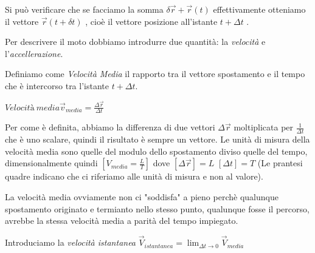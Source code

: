 Si può verificare che se facciamo la somma  $ \delta \overrightarrow{r} + \overrightarrow{r} ( t ) $ effettivamente otteniamo il vettore $ \overrightarrow{r} ( t + \delta t ) $ , cioè il vettore posizione all'istante $ t + \Delta t $ .

Per descrivere il moto dobbiamo introdurre due quantità: la \textit{velocità} e l'\textit{accellerazione}.

Definiamo come \textit{Velocità Media} il rapporto tra il vettore spostamento e il tempo che è intercorso 
tra l'istante $ t + \Delta t$. 


$Velocità\   media \overrightarrow{v}_{media} =\frac{\Delta \overrightarrow{r} }{\Delta t} $ 


Per come è definita, abbiamo la differenza di due vettori $\Delta \overrightarrow{r} $
moltiplicata per $\frac{1}{\Delta t}$ che è uno scalare, quindi il risultato è sempre
un vettore. 
Le unità di misura della velocità media sono quelle del modulo dello spostamento
diviso quelle del tempo, dimensionalmente quindi $[V_{media}= \frac{L}{T} ]$ dove $[\Delta\overrightarrow{r}]= L$
$[\Delta t]= T$ (Le prantesi quadre indicano che ci riferiamo alle unità di misura e non al valore).

La velocità media ovviamente non ci "soddisfa" a pieno perchè qualunque spostamento
originato e termianto nello stesso punto, qualunque fosse il percorso, avrebbe
la stessa velocità media a parità del tempo impiegato.

Introduciamo la \textit{velocità istantanea} 
$\overrightarrow{V}_{istantanea}= \lim_{\Delta t \to 0} \overrightarrow{V}_{media}$



